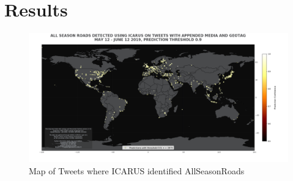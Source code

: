 \section{Results}
		\begin{figure}[h]
			\centering
			\includegraphics[scale=0.3]{images/map_ICARUS_thresh90}
			\caption{Map of Tweets where ICARUS identified AllSeasonRoads}
		\end{figure}